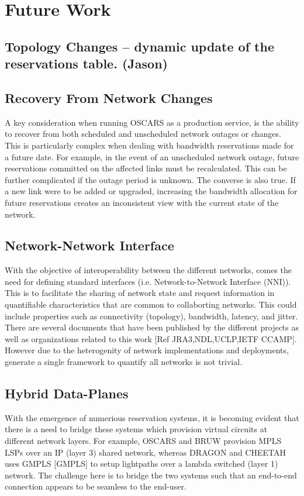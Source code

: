 \documentclass[conference]{IEEEtran}
\begin{document}
\section{Future Work}
\subsection{Topology Changes -- dynamic update of the reservations table. (Jason)}

\subsection{Recovery From Network Changes}
A key consideration when running OSCARS as a production service, is the
ability to recover from both scheduled and unscheduled network outages or
changes.  This is particularly complex when dealing with bandwidth
reservations made for a future date.  For example, in the event of an
unscheduled network outage, future reservations committed on the affected
links must be recalculated. This can be further complicated if the outage
period is unknown.  The converse is also true.  If a new link were to be
added or upgraded, increasing the bandwidth allocation for future
reservations creates an inconsistent view with the current state of the
network.

\subsection{Network-Network Interface}
With the objective of interoperability between the different networks,
comes the need for defining standard interfaces (i.e. Network-to-Network
Interface (NNI)).  This is to facilitate the sharing of network state and
request information in quantifiable characteristics that are common to
collaborting networks.  This could include properties such as connectivity
(topology), bandwidth, latency, and jitter.  There are several documents
that have been published by the different projects as well as organizations
related to this work [Ref JRA3,NDL,UCLP,IETF CCAMP]. However due to the
heterogenity of network implementations and deployments, generate a single
framework to quantify all networks is not trivial.

\subsection{Hybrid Data-Planes}
With the emergence of numerious reservation systems, it is becoming evident 
that there is a need to bridge these systems which provision virtual circuits at different network layers.
For example, OSCARS and BRUW provision MPLS LSPs over an IP (layer 3) shared network, whereas DRAGON and CHEETAH uses
GMPLS [GMPLS] to setup lightpaths over a lambda switched (layer 1) network.  The challenge here is to bridge the two systems such
that an end-to-end connection appears to be seamless to the end-user.
\end{document}
